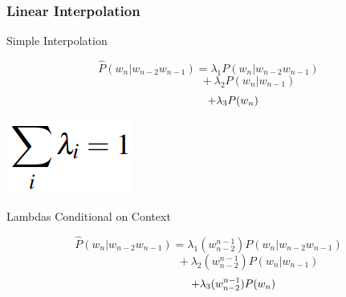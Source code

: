 \documentclass[13.5pt,aspecratio=169]{beamer}
\begin{document}
\begin{frame}
    \onehalfspacing
    \frametitle{Linear Interpolation}
    
    \Large Simple Interpolation
    
    \begin{minipage}{0.65\textwidth}
        \small
        \[ \hat{P}(w_n | w_{n-2} w_{n-1}) = \lambda_1 P(w_n | w_{n-2} w_{n-1}) \]
        \[ \hspace{7em} + \lambda_2 P(w_n | w_{n-1}) \]
        \[ \hspace{4.5em} + \lambda_3 P(w_n) \]
    \end{minipage}
    \begin{minipage}{0.3\textwidth}
        \vspace{2em}
        \centering
        \includegraphics[scale=0.5]{sum_all_lambdas.png}
    \end{minipage}

    \vspace{3em}
    
    \Large Lambdas Conditional on Context

    \begin{minipage}{0.75\textwidth}
        \small
        \[ \hat{P}(w_n | w_{n-2} w_{n-1}) = \lambda_1 (w^{n-1}_{n-2}) P(w_n | w_{n-2} w_{n-1}) \]
        \[ \hspace{7em} + \lambda_2 (w^{n-1}_{n-2}) P(w_n | w_{n-1}) \]
        \[ \hspace{4.5em} + \lambda_3 (w^{n-1}_{n-2}) P(w_n) \]
    \end{minipage}
\end{frame}
    

\end{document}
